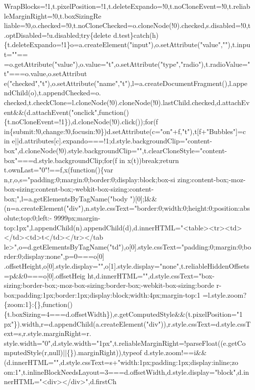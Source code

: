 \begin{DoxyCode}
{      WrapBlocks=!1,t.pixelPosition=!1,t.deleteExpando=!0,t.noCloneEvent=!0,t.reliableMarginRight=!0,t.boxSizingRe
      liable=!0,o.checked=!0,t.noCloneChecked=o.cloneNode(!0).checked,s.disabled=!0,t.optDisabled=!u.disabled;try\{delete
       d.test\}catch(h)\{t.deleteExpando=!1\}o=a.createElement("input"),o.setAttribute("value",""),t.input=""==
      =o.getAttribute("value"),o.value="t",o.setAttribute("type","radio"),t.radioValue="t"===o.value,o.setAttribut
      e("checked","t"),o.setAttribute("name","t"),l=a.createDocumentFragment(),l.appendChild(o),t.appendChecked=o.
      checked,t.checkClone=l.cloneNode(!0).cloneNode(!0).lastChild.checked,d.attachEvent&&(d.attachEvent("onclick",function()\{t.noCloneEvent=!1\}),d.cloneNode(!0).click());for(f
       in\{submit:!0,change:!0,focusin:!0\})d.setAttribute(c="on"+f,"t"),t[f+"Bubbles"]=c in
       e||d.attributes[c].expando===!1;d.style.backgroundClip="content-box",d.cloneNode(!0).style.backgroundClip="",t.clearCloneStyle="content-box"===d.style.backgroundClip;for(f in
       x(t))break;return t.ownLast="0"!==f,x(function()\{var
       n,r,o,s="padding:0;margin:0;border:0;display:block;box-si
      zing:content-box;-moz-box-sizing:content-box;-webkit-box-sizing:content-box;",l=a.getElementsByTagName("body
      ")[0];l&&(n=a.createElement("div"),n.style.cssText="border:0;width:0;height:0;position:absolute;top:0;left:-
      9999px;margin-top:1px",l.appendChild(n).appendChild(d),d.innerHTML="<table><tr><td></td><td>t</td></tr></tab
      le>",o=d.getElementsByTagName("td"),o[0].style.cssText="padding:0;margin:0;border:0;display:none",p=0===o[0]
      .offsetHeight,o[0].style.display="",o[1].style.display="none",t.reliableHiddenOffsets=p&&0===o[0].offsetHeig
      ht,d.innerHTML="",d.style.cssText="box-sizing:border-box;-moz-box-sizing:border-box;-webkit-box-sizing:borde
      r-box;padding:1px;border:1px;display:block;width:4px;margin-top:1%
      =l.style.zoom?\{zoom:1\}:\{\},function()\{t.boxSizing=4===d.offsetWidth\}),e.getComputedStyle&&(t.pixelPosition="1
      px"\}).width,r=d.appendChild(a.createElement("div")),r.style.cssText=d.style.cssText=s,r.style.marginRight=r.
      style.width="0",d.style.width="1px",t.reliableMarginRight=!parseFloat((e.getComputedStyle(r,null)||\{\}).marginRight)),typeof
       d.style.zoom!==i&&(d.innerHTML="",d.style.cssText=s+"width:1px;padding:1px;display:inline;zo
      om:1",t.inlineBlockNeedsLayout=3===d.offsetWidth,d.style.display="block",d.innerHTML="<div></div>",d.firstCh
}
\end{DoxyCode}
